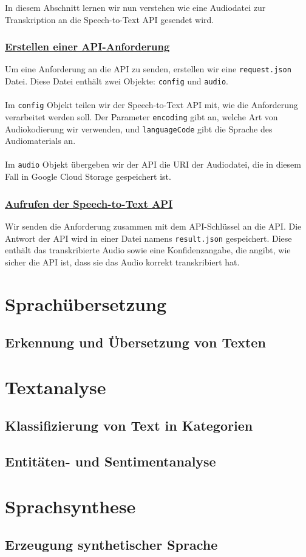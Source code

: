 \documentclass[12pt,a4paper]{article}
\begin{document}
In diesem Abschnitt lernen wir nun verstehen wie eine Audiodatei zur Transkription an die Speech-to-Text API gesendet wird.

\subsubsection*{\underline{Erstellen einer API-Anforderung}}

Um eine Anforderung an die API zu senden, erstellen wir eine \texttt{request.json} Datei. Diese Datei enthält zwei Objekte: \texttt{config} und \texttt{audio}.
\\ \\
Im \texttt{config} Objekt teilen wir der Speech-to-Text API mit, wie die Anforderung verarbeitet werden soll. Der Parameter \texttt{encoding} gibt an, welche Art von Audiokodierung wir verwenden, und \texttt{languageCode} gibt die Sprache des Audiomaterials an.
\\ \\
Im \texttt{audio} Objekt übergeben wir der API die URI der Audiodatei, die in diesem Fall in Google Cloud Storage gespeichert ist.

\subsubsection*{\underline{Aufrufen der Speech-to-Text API}}

Wir senden die Anforderung zusammen mit dem API-Schlüssel an die API. Die Antwort der API wird in einer Datei namens \texttt{result.json} gespeichert. Diese enthält das transkribierte Audio sowie eine Konfidenzangabe, die angibt, wie sicher die API ist, dass sie das Audio korrekt transkribiert hat.


\newpage

\section{Sprachübersetzung}
\subsection{Erkennung und Übersetzung von Texten}

\newpage

\section{Textanalyse}
\subsection{Klassifizierung von Text in Kategorien}
\subsection{Entitäten- und Sentimentanalyse}

\newpage

\section{Sprachsynthese}
\subsection{Erzeugung synthetischer Sprache}

\newpage
	
\end{document}

